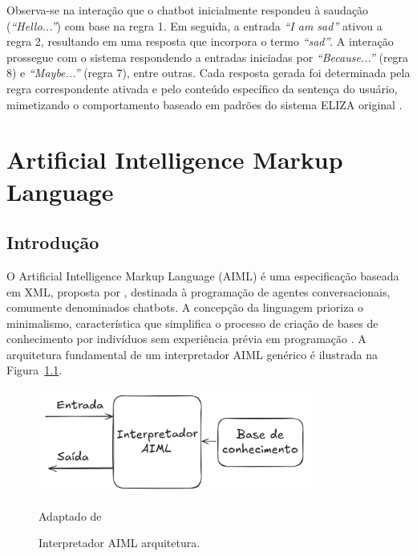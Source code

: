 \documentclass[14pt,a4paper,oneside]{book}
\begin{document}
Observa-se na interação que o chatbot inicialmente respondeu à saudação (\textit{``Hello...''}) com base na regra 1. Em seguida, a entrada \textit{``I am sad''} ativou a regra 2, resultando em uma resposta que incorpora o termo \textit{``sad''}. A interação prossegue com o sistema respondendo a entradas iniciadas por \textit{``Because...''} (regra 8) e \textit{``Maybe...''} (regra 7), entre outras. Cada resposta gerada foi determinada pela regra correspondente ativada e pelo conteúdo específico da sentença do usuário, mimetizando o comportamento baseado em padrões do sistema ELIZA original \cite{Abdul-Kader2015}.


\chapter{Artificial Intelligence Markup
Language}

\section{Introdução}

O Artificial Intelligence Markup Language (AIML) é uma especificação baseada em XML, proposta por \cite{Wallace2009}, destinada à programação de agentes conversacionais, comumente denominados chatbots. A concepção da linguagem prioriza o minimalismo, característica que simplifica o processo de criação de bases de conhecimento por indivíduos sem experiência prévia em programação \cite{Wallace2009}. A arquitetura fundamental de um interpretador AIML genérico é ilustrada na Figura~\ref{fig:interpretador}.

\begin{figure}
    \centering
    \caption{Interpretador AIML arquitetura.}
    \includegraphics[width=0.8\textwidth]{./fig/aimlbase.png} 
    \label{fig:interpretador}
    \vspace{0.2cm} 
    {\footnotesize 
	
	Adaptado de \cite{Silva2007}}
\end{figure}
\end{document}
